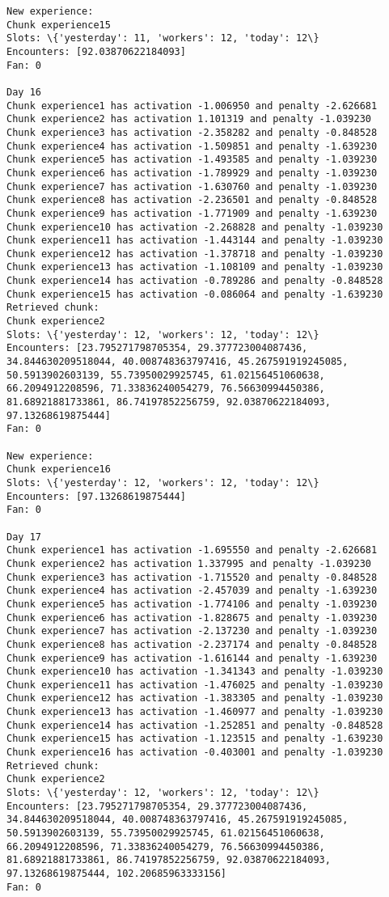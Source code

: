 \documentclass[11pt]{article}
\begin{document}
\begin{Verbatim}[commandchars=\\\{\}]
New experience:
Chunk experience15
Slots: \{'yesterday': 11, 'workers': 12, 'today': 12\}
Encounters: [92.03870622184093]
Fan: 0

Day 16
Chunk experience1 has activation -1.006950 and penalty -2.626681
Chunk experience2 has activation 1.101319 and penalty -1.039230
Chunk experience3 has activation -2.358282 and penalty -0.848528
Chunk experience4 has activation -1.509851 and penalty -1.639230
Chunk experience5 has activation -1.493585 and penalty -1.039230
Chunk experience6 has activation -1.789929 and penalty -1.039230
Chunk experience7 has activation -1.630760 and penalty -1.039230
Chunk experience8 has activation -2.236501 and penalty -0.848528
Chunk experience9 has activation -1.771909 and penalty -1.639230
Chunk experience10 has activation -2.268828 and penalty -1.039230
Chunk experience11 has activation -1.443144 and penalty -1.039230
Chunk experience12 has activation -1.378718 and penalty -1.039230
Chunk experience13 has activation -1.108109 and penalty -1.039230
Chunk experience14 has activation -0.789286 and penalty -0.848528
Chunk experience15 has activation -0.086064 and penalty -1.639230
Retrieved chunk:
Chunk experience2
Slots: \{'yesterday': 12, 'workers': 12, 'today': 12\}
Encounters: [23.795271798705354, 29.377723004087436, 34.844630209518044, 40.008748363797416, 45.267591919245085, 50.5913902603139, 55.73950029925745, 61.02156451060638, 66.2094912208596, 71.33836240054279, 76.56630994450386, 81.68921881733861, 86.74197852256759, 92.03870622184093, 97.13268619875444]
Fan: 0

New experience:
Chunk experience16
Slots: \{'yesterday': 12, 'workers': 12, 'today': 12\}
Encounters: [97.13268619875444]
Fan: 0

Day 17
Chunk experience1 has activation -1.695550 and penalty -2.626681
Chunk experience2 has activation 1.337995 and penalty -1.039230
Chunk experience3 has activation -1.715520 and penalty -0.848528
Chunk experience4 has activation -2.457039 and penalty -1.639230
Chunk experience5 has activation -1.774106 and penalty -1.039230
Chunk experience6 has activation -1.828675 and penalty -1.039230
Chunk experience7 has activation -2.137230 and penalty -1.039230
Chunk experience8 has activation -2.237174 and penalty -0.848528
Chunk experience9 has activation -1.616144 and penalty -1.639230
Chunk experience10 has activation -1.341343 and penalty -1.039230
Chunk experience11 has activation -1.476025 and penalty -1.039230
Chunk experience12 has activation -1.383305 and penalty -1.039230
Chunk experience13 has activation -1.460977 and penalty -1.039230
Chunk experience14 has activation -1.252851 and penalty -0.848528
Chunk experience15 has activation -1.123515 and penalty -1.639230
Chunk experience16 has activation -0.403001 and penalty -1.039230
Retrieved chunk:
Chunk experience2
Slots: \{'yesterday': 12, 'workers': 12, 'today': 12\}
Encounters: [23.795271798705354, 29.377723004087436, 34.844630209518044, 40.008748363797416, 45.267591919245085, 50.5913902603139, 55.73950029925745, 61.02156451060638, 66.2094912208596, 71.33836240054279, 76.56630994450386, 81.68921881733861, 86.74197852256759, 92.03870622184093, 97.13268619875444, 102.20685963333156]
Fan: 0


\end{Verbatim}
\end{document}
